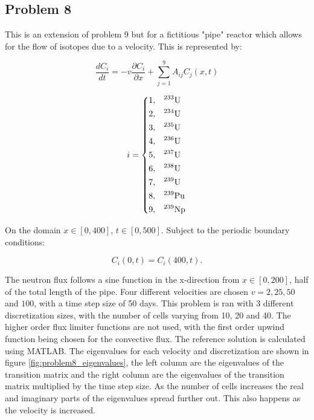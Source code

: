 \clearpage

\subsection{Problem 8}
This is an extension of problem 9 but for a fictitious "pipe" reactor which allows for the flow of isotopes due to a velocity. This is represented by:

\begin{equation}
\frac{d C_i}{dt} = -v\frac{\partial C_{i}}{\partial x} + \sum^9_{j = 1} A_{ij} C_j (x, t)
\end{equation}

\begin{equation}
i = \begin{dcases}
  1 , & \text{$^{233}$U}  \\
  2 , & \text{$^{234}$U}  \\
  3 , & \text{$^{235}$U}  \\
  4 , & \text{$^{236}$U}  \\
  5 , & \text{$^{237}$U}  \\
  6 , & \text{$^{238}$U}  \\
  7 , & \text{$^{239}$U}  \\
  8 , & \text{$^{239}$Pu} \\
  9 , & \text{$^{239}$Np} \\
\end{dcases}
\end{equation}

\noindent On the domain $x \in [0, 400]$, $t \in [0, 500]$. Subject to the periodic boundary conditions:

\begin{equation}
    C_{i}(0,t) = C_{i}(400,t).
\end{equation}

\noindent The neutron flux follows a sine function in the x-direction from $x \in [0, 200]$, half of the total length of the pipe. Four different velocities are chosen $ v = 2, 25, 50 $ and $100$, with a time step size of 50 days. This problem is ran with 3 different discretization sizes, with the number of cells varying from 10, 20 and 40. The higher order flux limiter functions are not used, with the first order upwind function being chosen for the convective flux. The reference solution is calculated using MATLAB. The eigenvalues for each velocity and discretization are shown in figure \ref{fig:problem8_eigenvalues}, the left column are the eigenvalues of the transition matrix and the right column are the eigenvalues of the transition matrix multiplied by the time step size. As the number of cells increases the real and imaginary parts of the eigenvalues spread further out. This also happens as the velocity is increased. 


